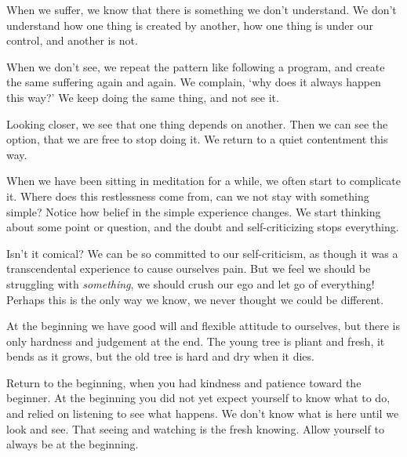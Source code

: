 
When we suffer, we know that there is something we don't understand. We
don't understand how one thing is created by another, how one thing is
under our control, and another is not.

When we don't see, we repeat the pattern like following a program, and
create the same suffering again and again. We complain, `why does it
always happen this way?' We keep doing the same thing, and not see it.

Looking closer, we see that one thing depends on another. Then we can
see the option, that we are free to stop doing it. We return to a quiet
contentment this way.


When we have been sitting in meditation for a while, we often start to
complicate it. Where does this restlessness come from, can we not stay
with something simple? Notice how belief in the simple experience
changes. We start thinking about some point or question, and the doubt
and self-criticizing stops everything.

Isn't it comical? We can be so committed to our self-criticism, as
though it was a transcendental experience to cause ourselves pain. But
we feel we should be struggling with \emph{something}, we should crush
our ego and let go of everything! Perhaps this is the only way we know,
we never thought we could be different.

At the beginning we have good will and flexible attitude to ourselves,
but there is only hardness and judgement at the end. The young tree is
pliant and fresh, it bends as it grows, but the old tree is hard and dry
when it dies.

Return to the beginning, when you had kindness and patience toward the
beginner. At the beginning you did not yet expect yourself to know what
to do, and relied on listening to see what happens. We don't know what
is here until we look and see. That seeing and watching is the fresh
knowing. Allow yourself to always be at the beginning.
